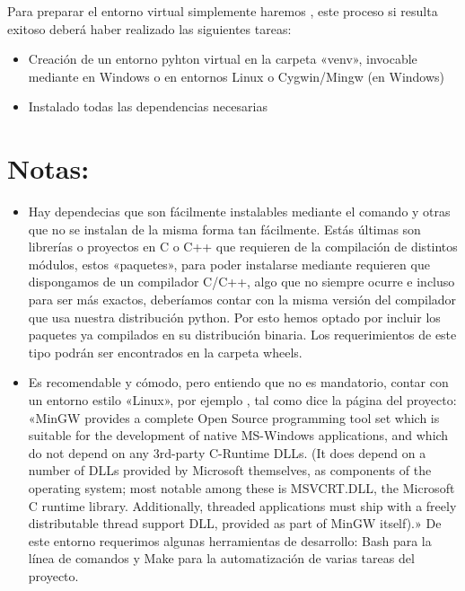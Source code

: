 \documentclass[a4paper,12pt,spanish]{sphinxmanual}
\begin{document}
Para preparar el entorno virtual simplemente haremos , este proceso si resulta exitoso deberá
haber realizado las siguientes tareas:
\begin{itemize}
\item {} 
Creación de un entorno pyhton virtual en la carpeta «venv», invocable mediante  en Windows
o  en entornos Linux o Cygwin/Mingw (en Windows)

\item {} 
Instalado todas las dependencias necesarias

\end{itemize}


\section{Notas:}
\label{\detokenize{desarrollo:notas}}\begin{itemize}
\item {} 
Hay dependecias que son fácilmente instalables mediante el comando  y otras que no se instalan de la misma forma
tan fácilmente. Estás últimas son librerías o proyectos en C o C++ que requieren de la compilación de distintos módulos,
estos «paquetes», para poder instalarse mediante  requieren que dispongamos de un compilador C/C++, algo que no
siempre ocurre e incluso para ser más exactos, deberíamos contar con la misma versión del compilador que usa nuestra
distribución python. Por esto hemos optado por incluir los paquetes ya compilados en su distribución binaria. Los
requerimientos de este tipo podrán ser encontrados en la carpeta wheels.

\item {} 
Es recomendable y cómodo, pero entiendo que no es mandatorio, contar con un entorno estilo «Linux»,
por ejemplo , tal como dice la página del proyecto: «MinGW provides a complete Open Source
programming tool set which is suitable for the development of native MS-Windows applications, and which do not depend on
any 3rd-party C-Runtime DLLs. (It does depend on a number of DLLs provided by Microsoft themselves, as components of the
operating system; most notable among these is MSVCRT.DLL, the Microsoft C runtime library. Additionally, threaded
applications must ship with a freely distributable thread support DLL, provided as part of MinGW itself).» De este
entorno requerimos algunas herramientas de desarrollo: Bash para la línea de comandos y Make para la automatización de
varias tareas del proyecto.

\end{itemize}
\end{document}
